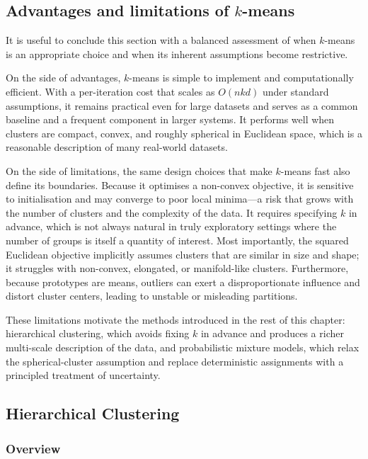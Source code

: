 \subsection*{Advantages and limitations of $k$-means}

It is useful to conclude this section with a balanced assessment of when $k$-means is an
appropriate choice and when its inherent assumptions become restrictive.

On the side of advantages, $k$-means is simple to implement and computationally
efficient. With a per-iteration cost that scales as $O(nkd)$ under standard assumptions, it
remains practical even for large datasets and serves as a common baseline and a frequent
component in larger systems. It performs well when clusters are compact, convex, and
roughly spherical in Euclidean space, which is a reasonable description of many real-world
datasets.

On the side of limitations, the same design choices that make $k$-means fast also define
its boundaries. Because it optimises a non-convex objective, it is sensitive to initialisation
and may converge to poor local minima---a risk that grows with the number of clusters and
the complexity of the data. It requires specifying $k$ in advance, which is not always
natural in truly exploratory settings where the number of groups is itself a quantity of
interest. Most importantly, the squared Euclidean objective implicitly assumes clusters that
are similar in size and shape; it struggles with non-convex, elongated, or manifold-like
clusters. Furthermore, because prototypes are means, outliers can exert a disproportionate
influence and distort cluster centers, leading to unstable or misleading partitions.

These limitations motivate the methods introduced in the rest of this chapter:
hierarchical clustering, which avoids fixing $k$ in advance and produces a richer
multi-scale description of the data, and probabilistic mixture models, which relax the
spherical-cluster assumption and replace deterministic assignments with a principled
treatment of uncertainty.

\subsection*{Hierarchical Clustering}

\subsubsection*{Overview}

